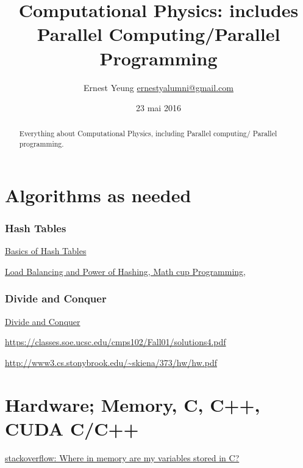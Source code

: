 \documentclass[10pt]{amsart}
\title{Computational Physics: includes Parallel Computing/Parallel Programming}
\author{Ernest Yeung \href{mailto:ernestyalumni@gmail.com}{ernestyalumni@gmail.com}}
\date{23 mai 2016}
\begin{document}

\maketitle

\tableofcontents


\begin{multicols*}{2}

\begin{abstract}
Everything about Computational Physics, including Parallel computing/ Parallel programming.  
\end{abstract}

\part{Algorithms as needed}

\section{Hash Tables}  

\href{https://www.hackerearth.com/practice/data-structures/hash-tables/basics-of-hash-tables/tutorial/}{Basics of Hash Tables}

\href{https://jeremykun.com/category/data-structures/}{Load Balancing and Power of Hashing, Math cup Programming}, 

\section{Divide and Conquer}

\href{https://people.eecs.berkeley.edu/~vazirani/algorithms/chap2.pdf}{Divide and Conquer}

\url{https://classes.soe.ucsc.edu/cmps102/Fall01/solutions4.pdf}

\url{http://www3.cs.stonybrook.edu/~skiena/373/hw/hw.pdf}

\part{Hardware; Memory, C, C++, CUDA C/C++}

\href{https://stackoverflow.com/questions/14588767/where-in-memory-are-my-variables-stored-in-c}{stackoverflow: Where in memory are my variables stored in C?}


\end{multicols*}
\end{document}
